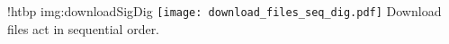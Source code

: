 \namedfigure
{!htbp}
{img:downloadSigDig}
{\texttt{[image: download\_files\_seq\_dig.pdf]}}
{Download files act in sequential order.}
